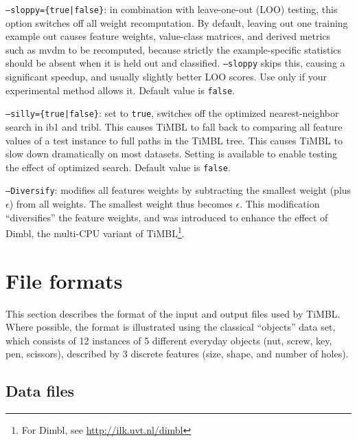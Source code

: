 \documentclass{report}
\begin{document}
\begin{description}
  \item {\tt --sloppy=\{true|false\}}: in combination with leave-one-out (LOO) testing, this option switches off all weight recomputation. By default, leaving out one training example out causes feature weights, value-class matrices, and derived metrics such as {\sc mvdm} to be recomputed, because strictly the example-specific statistics should be absent when it is held out and classified. {\tt --sloppy} skips this, causing a significant speedup, and usually slightly better LOO scores. Use only if your experimental method allows it. Default value is {\tt false}.
  \item {\tt --silly=\{true|false\}}: set to {\tt true}, switches off the optimized nearest-neighbor search in {\sc ib1} and {\sc tribl}. This causes TiMBL to fall back to comparing all feature values of a test instance to full paths in the TiMBL tree. This causes TiMBL to slow down dramatically on most datasets. Setting is available to enable testing the effect of optimized search. Default value is {\tt false}.
  \item{\tt --Diversify}: modifies all features weights by subtracting the smallest weight (plus $\epsilon$) from all weights. The smallest weight thus becomes $\epsilon$. This modification ``diversifies'' the feature weights, and was introduced to enhance the effect of {\sc Dimbl}, the multi-CPU variant of TiMBL\footnote{For {\sc Dimbl}, see \url{http://ilk.uvt.nl/dimbl}}.
\end{description}

\section{File formats}
\label{fileformats}

This section describes the format of the input and output files used
by TiMBL. Where possible, the format is illustrated using the
classical ``objects'' data set, which consists of 12 instances of 5
different everyday objects (nut, screw, key, pen, scissors), described
by 3 discrete features (size, shape, and number of holes).

\subsection{Data files}
\label{dataformats}
\end{document}
